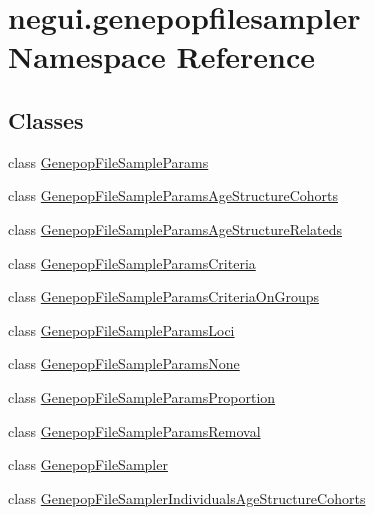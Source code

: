 \hypertarget{namespacenegui_1_1genepopfilesampler}{}\section{negui.\+genepopfilesampler Namespace Reference}
\label{namespacenegui_1_1genepopfilesampler}
\subsection*{Classes}
\begin{DoxyCompactItemize}
\item 
class \hyperlink{classnegui_1_1genepopfilesampler_1_1GenepopFileSampleParams}{Genepop\+File\+Sample\+Params}
\item 
class \hyperlink{classnegui_1_1genepopfilesampler_1_1GenepopFileSampleParamsAgeStructureCohorts}{Genepop\+File\+Sample\+Params\+Age\+Structure\+Cohorts}
\item 
class \hyperlink{classnegui_1_1genepopfilesampler_1_1GenepopFileSampleParamsAgeStructureRelateds}{Genepop\+File\+Sample\+Params\+Age\+Structure\+Relateds}
\item 
class \hyperlink{classnegui_1_1genepopfilesampler_1_1GenepopFileSampleParamsCriteria}{Genepop\+File\+Sample\+Params\+Criteria}
\item 
class \hyperlink{classnegui_1_1genepopfilesampler_1_1GenepopFileSampleParamsCriteriaOnGroups}{Genepop\+File\+Sample\+Params\+Criteria\+On\+Groups}
\item 
class \hyperlink{classnegui_1_1genepopfilesampler_1_1GenepopFileSampleParamsLoci}{Genepop\+File\+Sample\+Params\+Loci}
\item 
class \hyperlink{classnegui_1_1genepopfilesampler_1_1GenepopFileSampleParamsNone}{Genepop\+File\+Sample\+Params\+None}
\item 
class \hyperlink{classnegui_1_1genepopfilesampler_1_1GenepopFileSampleParamsProportion}{Genepop\+File\+Sample\+Params\+Proportion}
\item 
class \hyperlink{classnegui_1_1genepopfilesampler_1_1GenepopFileSampleParamsRemoval}{Genepop\+File\+Sample\+Params\+Removal}
\item 
class \hyperlink{classnegui_1_1genepopfilesampler_1_1GenepopFileSampler}{Genepop\+File\+Sampler}
\item 
class \hyperlink{classnegui_1_1genepopfilesampler_1_1GenepopFileSamplerIndividualsAgeStructureCohorts}{Genepop\+File\+Sampler\+Individuals\+Age\+Structure\+Cohorts}
\item 

\end{DoxyCompactItemize}

